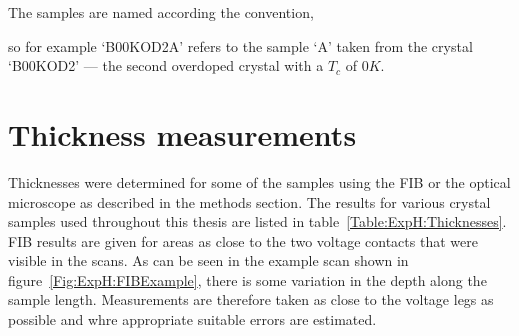 The samples are named according the convention,
\begin{quote}
\end{quote}
so for example `B00KOD2A' refers to the sample `A' taken from the crystal `B00KOD2' --- the second overdoped crystal with a $T_c$ of $\unit{0}{K}$.

\section{Thickness measurements}

Thicknesses were determined for some of the samples using the \ac{FIB} or the optical microscope as described in the methods section. The results for various crystal samples used throughout this thesis are listed in table~\ref{Table:ExpH:Thicknesses}. \ac{FIB} results are given for areas as close to the two voltage contacts that were visible in the scans. As can be seen in the example scan shown in figure~\ref{Fig:ExpH:FIBExample}, there is some variation in the depth along the sample length. Measurements are therefore taken as close to the voltage legs as possible and whre appropriate suitable errors are estimated.
